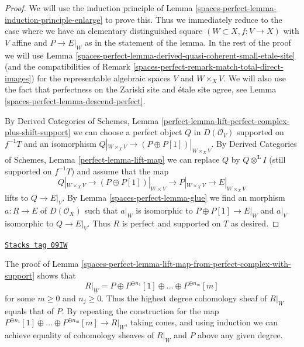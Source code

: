 \begin{proof}
We will use the induction principle of
Lemma \ref{spaces-perfect-lemma-induction-principle-enlarge} to prove this.
Thus we immediately reduce to the case where we have an
elementary distinguished square $(W \subset X, f : V \to X)$
with $V$ affine and $P \to E|_W$ as in the statement of the lemma.
In the rest of the proof we will use
Lemma \ref{spaces-perfect-lemma-derived-quasi-coherent-small-etale-site}
(and the compatibilities of Remark \ref{spaces-perfect-remark-match-total-direct-images})
for the representable algebraic spaces $V$ and $W \times_X V$.
We will also use the fact that perfectness on the Zariski site
and \'etale site agree, see Lemma \ref{spaces-perfect-lemma-descend-perfect}.

\medskip\noindent
By Derived Categories of Schemes,
Lemma \ref{perfect-lemma-lift-perfect-complex-plus-shift-support}
we can choose a perfect object $Q$ in $D(\mathcal{O}_V)$
supported on $f^{-1}T$ and an isomorphism
$Q|_{W \times_X V} \to (P \oplus P[1])|_{W \times_X V}$. By
Derived Categories of Schemes, Lemma \ref{perfect-lemma-lift-map}
we can replace $Q$ by $Q \otimes^\mathbf{L} I$ (still supported on $f^{-1}T$)
and assume that the map
$$
Q|_{W \times_X V} \to (P \oplus P[1])|_{W \times V}
\longrightarrow P|_{W \times_X V}
\longrightarrow
E|_{W \times_X V}
$$
lifts to $Q \to E|_V$. By Lemma \ref{spaces-perfect-lemma-glue}
we find an morphism $a : R \to E$ of $D(\mathcal{O}_X)$
such that $a|_W$ is isomorphic to $P \oplus P[1] \to E|_W$
and $a|_V$ isomorphic to $Q \to E|_V$.
Thus $R$ is perfect and supported on $T$ as desired.
\end{proof}

\begin{remark}[Addendum]
\label{spaces-perfect-remark-addendum}
\href{https://stacks.math.columbia.edu/tag/09IW}{\texttt{Stacks tag 09IW}}

The proof of Lemma \ref{spaces-perfect-lemma-lift-map-from-perfect-complex-with-support}
shows that
$$
R|_W = P \oplus P^{\oplus n_1}[1] \oplus \ldots \oplus P^{\oplus n_m}[m]
$$
for some $m \geq 0$ and $n_j \geq 0$. Thus the highest degree cohomology sheaf
of $R|_W$ equals that of $P$. By repeating the construction for the map
$P^{\oplus n_1}[1] \oplus \ldots \oplus P^{\oplus n_m}[m] \to R|_W$, taking
cones, and using induction we can achieve equality of cohomology sheaves
of $R|_W$ and $P$ above any given degree.
\end{remark}

